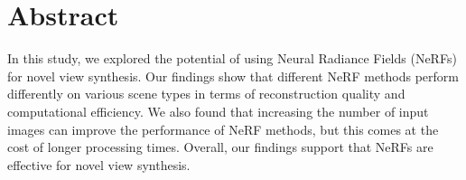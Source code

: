 \chapter*{Abstract}

In this study, we explored the potential of using Neural Radiance Fields (NeRFs) for novel view synthesis. Our findings show that different NeRF methods perform differently on various scene types in terms of reconstruction quality and computational efficiency. We also found that increasing the number of input images can improve the performance of NeRF methods, but this comes at the cost of longer processing times. Overall, our findings support that NeRFs are effective for novel view synthesis.